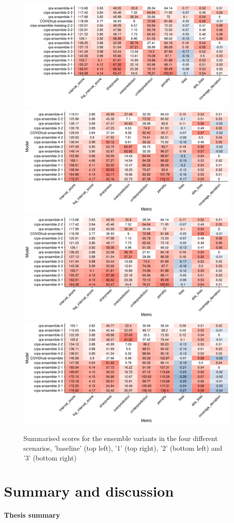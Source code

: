 \documentclass[
]{book}
\begin{document}
\begin{figure}
\includegraphics[width=0.5\linewidth]{../visualisation/chapter-5-results/ensembles/scenario-baseline/coloured-summarised-scores} \includegraphics[width=0.5\linewidth]{../visualisation/chapter-5-results/ensembles/scenario-1/coloured-summarised-scores} \includegraphics[width=0.5\linewidth]{../visualisation/chapter-5-results/ensembles/scenario-2/coloured-summarised-scores} \includegraphics[width=0.5\linewidth]{../visualisation/chapter-5-results/ensembles/scenario-3/coloured-summarised-scores} \caption{Summarised scores for the ensemble variants in the four different scenarios, 'baseline' (top left), '1' (top right), '2' (bottom left) and '3' (bottom right)}\label{fig:sensitivity-ensembles}
\end{figure}

\hypertarget{discussion}{%
\chapter{Summary and discussion}\label{discussion}}

\hypertarget{thesis-summary}{%
\subsubsection*{Thesis summary}\label{thesis-summary}}
\end{document}
